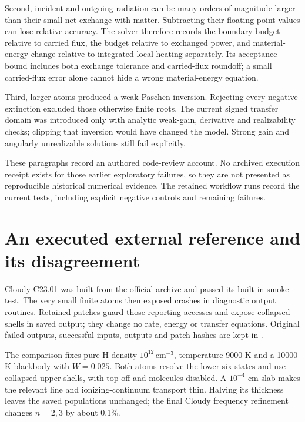 \documentclass[11pt,a4paper]{article}
\begin{document}
Second, incident and outgoing radiation can be many orders of magnitude larger
than their small net exchange with matter. Subtracting their floating-point
values can lose relative accuracy. The solver therefore records the boundary
budget relative to carried flux, the budget relative to exchanged power, and
material-energy change relative to integrated local heating separately. Its
acceptance bound includes both exchange tolerance and carried-flux roundoff;
a small carried-flux error alone cannot hide a wrong material-energy equation.

Third, larger atoms produced a weak Paschen inversion. Rejecting every negative
extinction excluded those otherwise finite roots. The current signed transfer
domain was introduced only with analytic weak-gain, derivative and
realizability checks; clipping that inversion would have changed the model.
Strong gain and angularly unrealizable solutions still fail explicitly.

These paragraphs record an authored code-review account. No archived execution
receipt exists for those earlier exploratory failures, so they are not presented
as reproducible historical numerical evidence. The retained workflow runs record
the current tests, including explicit negative controls and remaining failures.

\section{An executed external reference and its disagreement}
Cloudy C23.01 was built from the official archive and passed its built-in smoke
test. The very small finite atoms then exposed crashes in diagnostic output
routines. Retained patches guard those reporting accesses and expose collapsed
shells in saved output; they change no rate, energy or transfer equations.
Original failed outputs, successful inputs, outputs and patch hashes are kept in
.

The comparison fixes pure-H density $10^{12}\,\mathrm{cm}^{-3}$, temperature
9000 K and a 10000 K blackbody with $W=0.025$. Both atoms resolve the lower six
states and use collapsed upper shells, with top-off and molecules disabled.
A $10^{-4}$ cm slab makes the relevant line and ionizing-continuum transport
thin. Halving its thickness leaves the saved populations unchanged; the final
Cloudy frequency refinement changes $n=2,3$ by about 0.1\%.
\end{document}
